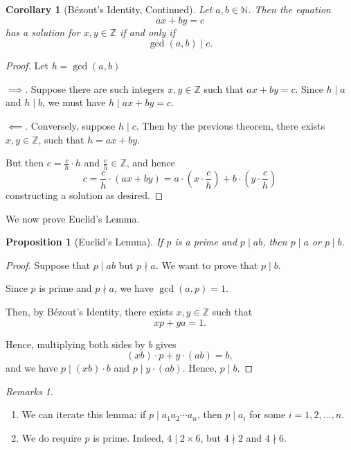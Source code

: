 \documentclass{article}
\newtheorem{proposition}[theorem]{Proposition}
\newtheorem{corollary}[theorem]{Corollary}
\theoremstyle{definition}
\theoremstyle{remark}
\newtheorem{remarks}[theorem]{Remarks}
\newcommand{\pqty}[1]{\left(#1\right)}
\newcommand{\divides}{\mid}
\newcommand{\notdivides}{\nmid}
\newcommand{\NN}{\mathbb{N}}
\newcommand{\ZZ}{\mathbb{Z}}
\begin{document}
\begin{corollary}[B\'{e}zout's Identity, Continued]
    Let \(a, b \in \NN\). Then the equation
    \[
        ax + by = c
    \]
    has a solution for \(x, y \in \ZZ\) if and only if
    \[
        \gcd\pqty{a, b} \divides c.
    \]
\end{corollary}

\begin{proof}
    Let \(h = \gcd\pqty{a, b}\)

    \(\implies\). Suppose there are such integers \(x, y \in \ZZ\) such that \(ax + by = c\). Since \(h \divides a\) and \(h \divides b\), we must have \(h \divides ax + by = c\).

    \(\impliedby\). Conversely, suppose \(h \divides c\). Then by the previous theorem, there exists \(x, y \in \ZZ\), such that \(h = ax + by\).

    But then \(c = \frac{c}{h} \cdot h\) and \(\frac{c}{h} \in \ZZ\), and hence
    \[
        c = \frac{c}{h} \cdot \pqty{ax + by} = a \cdot \pqty{x \cdot \frac{c}{h}} + b \cdot \pqty{y \cdot \frac{c}{h}}
    \]
    constructing a solution as desired.
\end{proof}

We now prove Euclid's Lemma.

\begin{proposition}[Euclid's Lemma]
    If \(p\) is a prime and \(p \divides ab\), then \(p \divides a\) or \(p \divides b\).
\end{proposition}

\begin{proof}
    Suppose that \(p \divides ab\) but \(p \notdivides a\). We want to prove that \(p \divides b\).

    Since \(p\) is prime and \(p \notdivides a\), we have \(\gcd\pqty{a, p} = 1\).

    Then, by B\'{e}zout's Identity, there exists \(x, y \in \ZZ\) such that
    \[
        xp + ya = 1.
    \]

    Hence, multiplying both sides by \(b\) gives
    \[
        \pqty{xb} \cdot p + y \cdot \pqty{ab} = b,
    \]
    and we have \(p \divides \pqty{xb} \cdot b\) and \(p \divides y \cdot \pqty{ab}\). Hence, \(p \divides b\).
\end{proof}

\begin{remarks}
    \begin{enumerate}
        \item We can iterate this lemma: if \(p \divides a_1 a_2 \cdots a_n\), then \(p \divides a_i\) for some \(i = 1, 2, \ldots, n\).
        \item We do require \(p\) is prime. Indeed, \(4 \divides 2 \times 6\), but \(4 \notdivides 2\) and \(4 \notdivides 6\).
    \end{enumerate}
\end{remarks}
\end{document}
